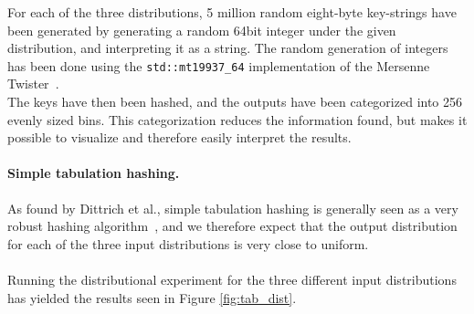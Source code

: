 \documentclass[11pt]{article} %
\begin{document}
For each of the three distributions, 5 million random eight-byte key-strings have been generated by generating a random 64bit integer under the given distribution, and interpreting it as a string. The random generation of integers has been done using the \verb|std::mt19937_64| implementation of the Mersenne Twister~\cite{MT02}.\\

The keys have then been hashed, and the outputs have been categorized into 256 evenly sized bins. This categorization reduces the information found, but makes it possible to visualize and therefore easily interpret the results.

\paragraph{Simple tabulation hashing.} As found by Dittrich et al., simple tabulation hashing is generally seen as a very robust hashing algorithm~\cite{RAD15}, and we therefore expect that the output distribution for each of the three input distributions is very close to uniform. \\
\\
Running the distributional experiment for the three different input distributions has yielded the results seen in Figure \ref{fig:tab_dist}.\\
\\
\end{document}
